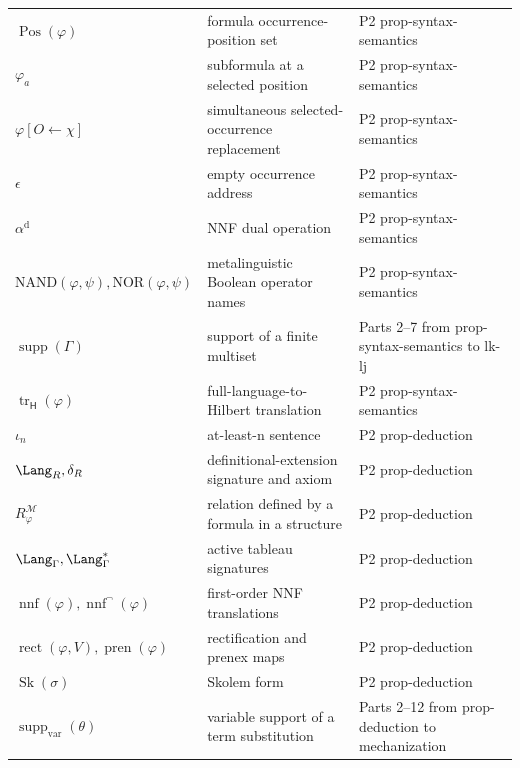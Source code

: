 \begin{longtable}{@{}p{}p{}p{}@{}}
\(\operatorname{Pos}(\varphi)\) & formula occurrence-position set & P2 prop-\allowbreak{}syntax-\allowbreak{}semantics \\
\(\varphi_a\) & subformula at a selected position & P2 prop-\allowbreak{}syntax-\allowbreak{}semantics \\
\(\varphi[O\leftarrow\chi]\) & simultaneous selected-occurrence replacement & P2 prop-\allowbreak{}syntax-\allowbreak{}semantics \\
\(\epsilon\) & empty occurrence address & P2 prop-\allowbreak{}syntax-\allowbreak{}semantics \\
\(\alpha^{\mathrm d}\) & NNF dual operation & P2 prop-\allowbreak{}syntax-\allowbreak{}semantics \\
\(\mathrm{NAND}(\varphi,\allowbreak \psi),\allowbreak \mathrm{NOR}(\varphi,\allowbreak \psi)\) & metalinguistic Boolean operator names & P2 prop-\allowbreak{}syntax-\allowbreak{}semantics \\
\(\operatorname{supp}(\Gamma)\) & support of a finite multiset & Parts 2--7 from prop-\allowbreak{}syntax-\allowbreak{}semantics to lk-\allowbreak{}lj \\
\(\operatorname{tr}_{\mathsf H}(\varphi)\) & full-language-to-Hilbert translation & P2 prop-\allowbreak{}syntax-\allowbreak{}semantics \\
\(\iota_n\) & at-least-n sentence & P2 prop-\allowbreak{}deduction \\
\(\Lang_R,\allowbreak \delta_R\) & definitional-extension signature and axiom & P2 prop-\allowbreak{}deduction \\
\(R^{\mathcal M}_{\varphi}\) & relation defined by a formula in a structure & P2 prop-\allowbreak{}deduction \\
\(\Lang_{\Gamma},\allowbreak \Lang_{\Gamma}^{*}\) & active tableau signatures & P2 prop-\allowbreak{}deduction \\
\(\operatorname{nnf}(\varphi),\allowbreak \operatorname{nnf}^{\neg}(\varphi)\) & first-order NNF translations & P2 prop-\allowbreak{}deduction \\
\(\operatorname{rect}(\varphi,\allowbreak V),\allowbreak \operatorname{pren}(\varphi)\) & rectification and prenex maps & P2 prop-\allowbreak{}deduction \\
\(\operatorname{Sk}(\sigma)\) & Skolem form & P2 prop-\allowbreak{}deduction \\
\(\operatorname{supp}_{\mathrm{var}}(\theta)\) & variable support of a term substitution & Parts 2--12 from prop-\allowbreak{}deduction to mechanization \\

\end{longtable}
